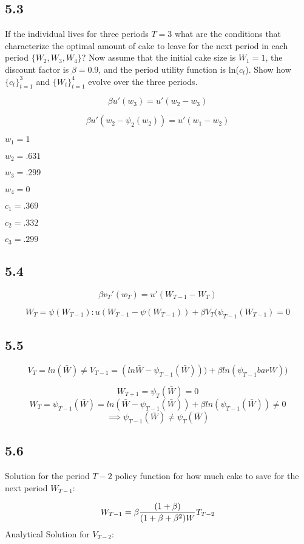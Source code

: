 \documentclass[letterpaper,12pt]{article}
\theoremstyle{definition}
\begin{document}
\subsection*{5.3}

If the individual lives for three periods $T = 3$ what are the conditions that characterize the optimal amount of cake to leave for the next period in each period $\{W_2, W_3, W_4\}$? Now assume that the initial cake size is $W_1 = 1$, the discount factor is $\beta = 0.9$, and the period utility function is ln($c_t$). Show how $\{c_t\}_{t=1}^3$ and $\{W_t\}_{t=1}^4$ evolve over the three periods. 

\[ \beta u'(w_3) = u'(w_2-w_3)\]

\[ \beta u'(w_2 - \psi_2(w_2)) = u'(w_1-w_2)\]

$w_1 = 1$

$w_2 = .631$

$w_3 = .299$

$w_4 = 0$


$c_1 = .369$

$c_2 = .332$

$c_3 = .299$

\subsection*{5.4}

\[ \beta v_T'(w_T) = u'(W_{T-1}-W_T)\]

\[ W_T = \psi(W_{T-1}): u(W_{T-1} - \psi(W_{T-1})) + \beta V_T(\psi_{T-1}(W_{T-1}) = 0\]

\subsection*{5.5}

\[V_T = ln (\bar{W}) \neq V_{T-1} = (ln \bar{W} - \psi_{T-1}(\bar{W}))) + \beta ln (\psi_{T-1}bar{W}))\]

\[W_{T+1} = \psi_T(\bar{W}) = 0\]
\[W_T = \psi_{T-1}(\bar{W}) = ln(\bar{W} - \psi_{T-1}(\bar{W})) + \beta ln(\psi_{T-1}(\bar{W})) \neq 0  \]
\[\implies \psi_{T-1}(\bar{W}) \neq \psi_{T}(\bar{W})\]

\subsection*{5.6}

Solution for the period $T - 2$ policy function for how much cake to save for the next period $W_{T-1}$:

\[ W_{T-1} = \beta{(1+\beta) \over (1+\beta+\beta^2)W}T_{T-2}\]
Analytical Solution for $V_{T-2}$:
\end{document}
